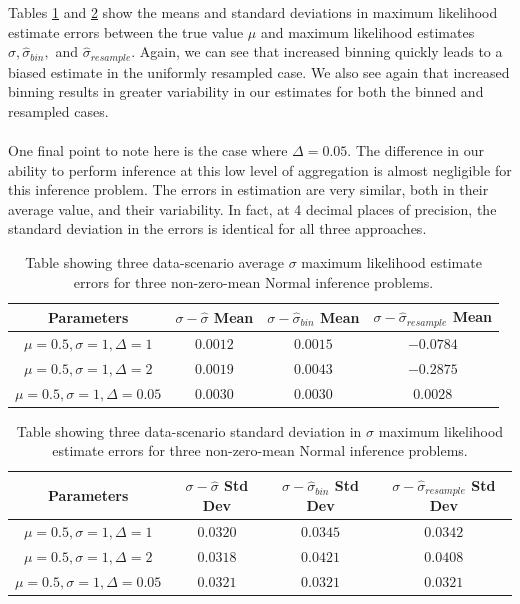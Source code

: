 \documentclass[11pt,a4,twosided,singlespacing,titlepagenumber=on,numbers=endperiod]{scrreprt}
\numberwithin{equation}{chapter} %
\theoremstyle{remark}
\begin{document}
Tables \ref{tab:sigma_hat_mean_offset} and \ref{tab:sigma_hat_std_offset} show the means and standard deviations in maximum likelihood estimate errors between the true value $\mu$ and maximum likelihood estimates $\hat{\sigma}, \hat{\sigma}_{bin}, $ and $\hat{\sigma}_{resample}$. Again, we can see that increased binning quickly leads to a biased estimate in the uniformly resampled case. We also see again that increased binning results in greater variability in our estimates for both the binned and resampled cases. \\\\
One final point to note here is the case where $\Delta=0.05$. The difference in our ability to perform inference at this low level of aggregation is almost negligible for this inference problem. The errors in estimation are very similar, both in their average value, and their variability. In fact, at 4 decimal places of precision, the standard deviation in the errors is identical for all three approaches.

\begin{table}[ht]
	\centering
	\begin{tabular}{|c|c|c|c|}
	\hline
		Parameters & $\sigma - \hat{\sigma}$ Mean & $\sigma - \hat{\sigma}_{bin}$ Mean & $\sigma - \hat{\sigma}_{resample}$ Mean  \\
	\hline
		$\mu=0.5, \sigma=1, \Delta=1$ & $0.0012$ & $0.0015$ & $-0.0784$ \\
	\hline
		$\mu=0.5, \sigma=1, \Delta=2$ & $0.0019$ & $0.0043$ & $-0.2875$ \\
	\hline
		$\mu=0.5, \sigma=1, \Delta=0.05$ & $0.0030$ & $0.0030$ & $0.0028$ \\
	\hline
	\end{tabular}
	\caption{Table showing three data-scenario average $\sigma$ maximum likelihood estimate errors for three non-zero-mean Normal inference problems.}
	\label{tab:sigma_hat_mean_offset}
\end{table}
\begin{table}[ht]
	\centering
	\begin{tabular}{|c|c|c|c|}
	\hline
	Parameters & $\sigma - \hat{\sigma}$ Std Dev & $\sigma - \hat{\sigma}_{bin}$ Std Dev & $\sigma - \hat{\sigma}_{resample}$ Std Dev \\
	\hline
		$\mu=0.5, \sigma=1, \Delta=1$ & $0.0320$ & $0.0345$ & $0.0342$ \\
	\hline
		$\mu=0.5, \sigma=1, \Delta=2$ & $0.0318$ & $0.0421$ & $0.0408$ \\
	\hline
		$\mu=0.5, \sigma=1, \Delta=0.05$ & $0.0321$ & $0.0321$ & $0.0321$ \\
	\hline
	\end{tabular}
	\caption{Table showing three data-scenario standard deviation in $\sigma$ maximum likelihood estimate errors for three non-zero-mean Normal inference problems.}
	\label{tab:sigma_hat_std_offset}
\end{table}
\end{document}
